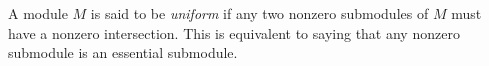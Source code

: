 \documentclass{article}
\begin{document}
A module $M$ is said to be {\it uniform} if any two nonzero submodules of $M$ must have a nonzero intersection.  This is equivalent to saying that any nonzero submodule is an essential submodule.
\end{document}
